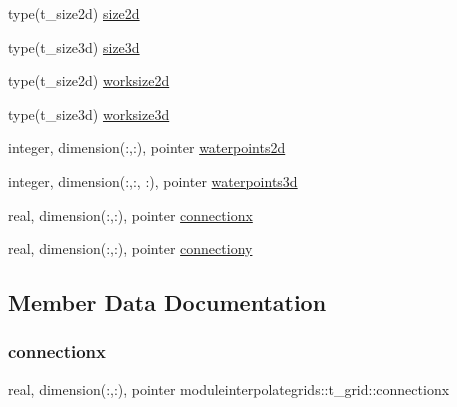 \begin{DoxyCompactItemize}
\item 
type(t\+\_\+size2d) \mbox{\hyperlink{structmoduleinterpolategrids_1_1t__grid_a5b9fa050f4b34a2d5212bdabf31c6b2c}{size2d}}
\item 
type(t\+\_\+size3d) \mbox{\hyperlink{structmoduleinterpolategrids_1_1t__grid_af4e9967480182e070dc795af8b3d1531}{size3d}}
\item 
type(t\+\_\+size2d) \mbox{\hyperlink{structmoduleinterpolategrids_1_1t__grid_a315b2c545c8dbf5c44a363999819ec60}{worksize2d}}
\item 
type(t\+\_\+size3d) \mbox{\hyperlink{structmoduleinterpolategrids_1_1t__grid_af7e96aaa7baf20f380cc0a4f2bb710fe}{worksize3d}}
\item 
integer, dimension(\+:,\+:), pointer \mbox{\hyperlink{structmoduleinterpolategrids_1_1t__grid_a025ff5695a208781471a027dde35adf6}{waterpoints2d}}
\item 
integer, dimension(\+:,\+:, \+:), pointer \mbox{\hyperlink{structmoduleinterpolategrids_1_1t__grid_a24a6ea2c01e4d9f3c78ef17537b0eb44}{waterpoints3d}}
\item 
real, dimension(\+:,\+:), pointer \mbox{\hyperlink{structmoduleinterpolategrids_1_1t__grid_aa0f2387bb4f06a3cee4ffac9ea5842e8}{connectionx}}
\item 
real, dimension(\+:,\+:), pointer \mbox{\hyperlink{structmoduleinterpolategrids_1_1t__grid_aea713c4672482baacc111917a22f4993}{connectiony}}
\end{DoxyCompactItemize}


\subsection{Member Data Documentation}
\mbox{\label{structmoduleinterpolategrids_1_1t__grid_aa0f2387bb4f06a3cee4ffac9ea5842e8}} 
\subsubsection{\texorpdfstring{connectionx}{connectionx}}
{\footnotesize\ttfamily real, dimension(\+:,\+:), pointer moduleinterpolategrids\+::t\+\_\+grid\+::connectionx\hspace{0.3cm}{\ttfamily [private]}}

\mbox{\label{structmoduleinterpolategrids_1_1t__grid_aea713c4672482baacc111917a22f4993}} 
